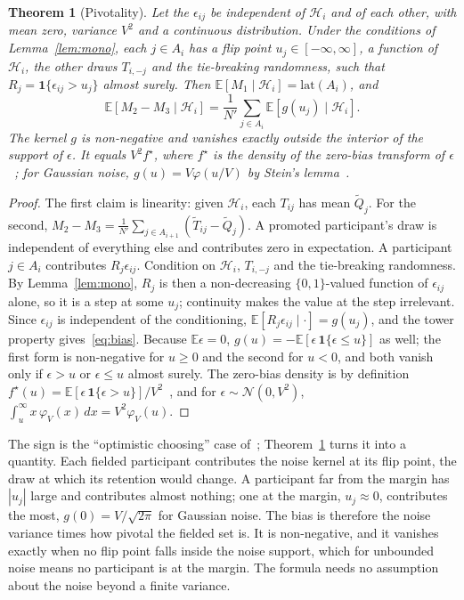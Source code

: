 \documentclass[sigconf,anonymous,review,nonacm]{acmart}
\newtheorem{theorem}{Theorem}
\begin{document}
\begin{theorem}[Pivotality]\label{thm:pivot}
Let the $\epsilon_{ij}$ be independent of $\mathcal H_i$ and of each other, with mean zero,
variance $V^2$ and a continuous distribution. Under the conditions of
Lemma~\ref{lem:mono}, each $j\in A_i$ has a flip point $u_j\in[-\infty,\infty]$, a function
of $\mathcal H_i$, the other draws $T_{i,-j}$ and the tie-breaking randomness, such that
$R_j=\mathbf 1\{\epsilon_{ij}>u_j\}$ almost surely. Then
$\mathbb E[M_1\mid\mathcal H_i]=\mathrm{lat}(A_i)$, and
\begin{equation}\label{eq:bias}
\mathbb E[M_2-M_3\mid\mathcal H_i]=\frac{1}{N'}\sum_{j\in A_i}\mathbb E\!\left[g(u_j)\mid\mathcal H_i\right].
\end{equation}
The kernel $g$ is non-negative and vanishes exactly outside the interior of the support of
$\epsilon$. It equals $V^2 f^\star$, where $f^\star$ is the density of the zero-bias
transform of $\epsilon$~\cite{goldstein1997stein}; for Gaussian noise, $g(u)=V\varphi(u/V)$
by Stein's lemma~\cite{stein1981estimation}.
\end{theorem}
\begin{proof}
The first claim is linearity: given $\mathcal H_i$, each $T_{ij}$ has mean
$\tilde Q_j$. For the second, $M_2-M_3=\frac1{N'}\sum_{j\in A_{i+1}}(\tilde T_{ij}-\tilde Q_j)$.
A promoted participant's draw is independent of everything else and contributes zero in
expectation. A participant $j\in A_i$ contributes $R_j\epsilon_{ij}$. Condition on
$\mathcal H_i$, $T_{i,-j}$ and the tie-breaking randomness. By Lemma~\ref{lem:mono}, $R_j$
is then a non-decreasing $\{0,1\}$-valued function of $\epsilon_{ij}$ alone, so it is a step
at some $u_j$; continuity makes the value at the step irrelevant. Since $\epsilon_{ij}$ is
independent of the conditioning, $\mathbb E[R_j\epsilon_{ij}\mid\cdot]=g(u_j)$, and the tower
property gives~\eqref{eq:bias}. Because $\mathbb E\epsilon=0$,
$g(u)=-\mathbb E[\epsilon\,\mathbf 1\{\epsilon\le u\}]$ as well; the first form is
non-negative for $u\ge0$ and the second for $u<0$, and both vanish only if $\epsilon>u$ or
$\epsilon\le u$ almost surely. The zero-bias density is by definition
$f^\star(u)=\mathbb E[\epsilon\,\mathbf 1\{\epsilon>u\}]/V^2$~\cite{goldstein1997stein},
and for $\epsilon\sim\mathcal N(0,V^2)$,
$\int_u^\infty x\,\varphi_V(x)\,dx=V^2\varphi_V(u)$.
\end{proof}

The sign is the ``optimistic choosing'' case of~\cite{shin2019bias}; Theorem~\ref{thm:pivot}
turns it into a quantity. Each fielded
participant contributes the noise kernel at its flip point, the draw at which its
retention would change. A participant far from the margin has $|u_j|$ large and contributes
almost nothing; one at the margin, $u_j\approx0$, contributes the most, $g(0)=V/\sqrt{2\pi}$
for Gaussian noise. The bias is therefore the noise variance times how pivotal the fielded
set is. It is non-negative, and it vanishes exactly when no flip point falls inside the
noise support, which for unbounded noise means no participant is at the margin. The
formula needs no assumption about the noise beyond a finite variance.
\end{document}
